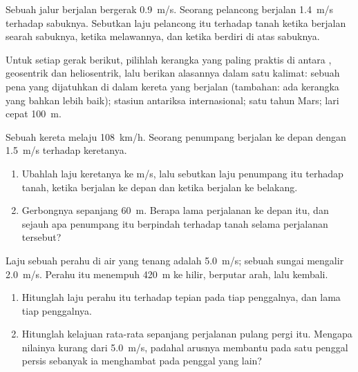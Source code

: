 \begin{exercise}[$\star$]\label{exo:g10:relative-motion:4}
Sebuah jalur berjalan bergerak \qty{0.9}{m/s}. Seorang pelancong
berjalan \qty{1.4}{m/s} terhadap sabuknya. Sebutkan laju pelancong itu
terhadap tanah ketika berjalan searah sabuknya, ketika melawannya, dan
ketika berdiri  di atas sabuknya.
\end{exercise}

\begin{exercise}[$\star$]\label{exo:g10:relative-motion:5}
Untuk setiap gerak berikut, pilihlah kerangka yang paling praktis di
antara , geosentrik dan heliosentrik, lalu berikan
alasannya dalam satu kalimat: sebuah pena yang dijatuhkan di dalam
kereta yang berjalan (tambahan: ada kerangka yang bahkan lebih baik);
 stasiun antariksa internasional; satu tahun Mars; lari cepat
\qty{100}{m}.
\end{exercise}

\begin{exercise}[$\star\star$]\label{exo:g10:relative-motion:6}
Sebuah kereta melaju \qty{108}{km/h}. Seorang penumpang berjalan ke
depan dengan \qty{1.5}{m/s} terhadap keretanya.
\begin{enumerate}
  \item Ubahlah laju keretanya ke \unit{m/s}, lalu sebutkan laju
        penumpang itu terhadap tanah, ketika berjalan ke depan dan
        ketika berjalan ke belakang.
  \item Gerbongnya sepanjang \qty{60}{m}. Berapa lama perjalanan ke
        depan itu, dan sejauh apa penumpang itu berpindah terhadap
        tanah selama perjalanan tersebut?
\end{enumerate}
\end{exercise}

\begin{exercise}[$\star\star$]\label{exo:g10:relative-motion:7}
Laju sebuah perahu di air yang tenang adalah \qty{5.0}{m/s}; sebuah
sungai mengalir \qty{2.0}{m/s}. Perahu itu menempuh \qty{420}{m} ke
hilir, berputar arah, lalu kembali.
\begin{enumerate}
  \item Hitunglah laju perahu itu terhadap tepian pada tiap penggalnya,
        dan lama tiap penggalnya.
  \item Hitunglah kelajuan rata-rata sepanjang perjalanan pulang pergi
        itu. Mengapa nilainya kurang dari \qty{5.0}{m/s}, padahal
        arusnya membantu pada satu penggal persis sebanyak ia
        menghambat pada penggal yang lain?
\end{enumerate}
\end{exercise}

